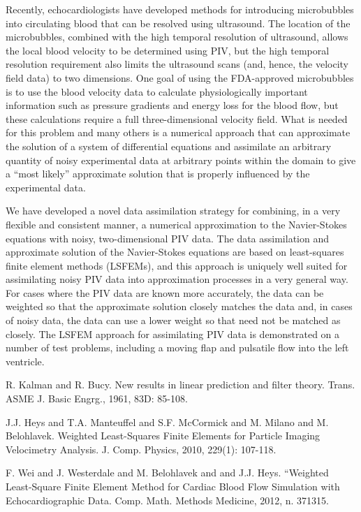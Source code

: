 \documentclass[article, A4, 11pt]{llncs}%
\begin{document}
Recently, echocardiologists have developed methods for introducing microbubbles into circulating blood that can be resolved using ultrasound. The location of the microbubbles, combined with the high temporal resolution of ultrasound, allows the local blood velocity to be determined using PIV, but the high temporal resolution requirement also limits the ultrasound scans (and, hence, the velocity field data) to two dimensions. One goal of using the FDA-approved microbubbles is to use the blood velocity data to calculate physiologically important information such as pressure gradients and energy loss for the blood flow, but these calculations require a full three-dimensional velocity field. What is needed for this problem and many others is a numerical approach that can approximate the solution of a system of differential equations and assimilate an arbitrary quantity of noisy experimental data at arbitrary points within the domain to give a “most likely” approximate solution that is properly influenced by the experimental data.

We have developed a novel data assimilation strategy for combining, in a very flexible and consistent manner, a numerical approximation to the Navier-Stokes equations with noisy, two-dimensional PIV data. The data assimilation and approximate solution of the Navier-Stokes equations are based on least-squares finite element methods (LSFEMs), and this approach is uniquely well suited for assimilating noisy PIV data into approximation processes in a very general way. For cases where the PIV data are known more accurately, the data can be weighted so that the approximate solution closely matches the data and, in cases of noisy data, the data can use a lower weight so that need not be matched as closely. The LSFEM approach for assimilating PIV data is demonstrated on a number of test problems, including a moving flap and pulsatile flow into the left ventricle.


\begin{thebibliography}{10}
{\sc R. Kalman and R. Bucy}. {New results in linear prediction and filter theory}. Trans. ASME J. Basic Engrg., 1961, 83D: 85-108.

{\sc J.J. Heys and T.A. Manteuffel and S.F. McCormick and M. Milano and M. Belohlavek}. {Weighted Least-Squares Finite Elements for Particle Imaging Velocimetry Analysis}.  J. Comp. Physics, 2010, 229(1): 107-118.

{\sc F. Wei and J. Westerdale and M. Belohlavek and and J.J. Heys}. {“Weighted Least-Square Finite Element Method for Cardiac Blood Flow Simulation with Echocardiographic Data}. Comp. Math. Methods Medicine, 2012, n. 371315.
\end{thebibliography} %
\end{document}
